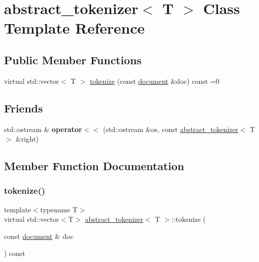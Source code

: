 \hypertarget{classabstract__tokenizer}{}\section{abstract\+\_\+tokenizer$<$ T $>$ Class Template Reference}
\label{classabstract__tokenizer}
\subsection*{Public Member Functions}
\begin{DoxyCompactItemize}
\item 
virtual std\+::vector$<$ T $>$ \hyperlink{classabstract__tokenizer_a5948210e787d9ed3681800b4e3926701}{tokenize} (const \hyperlink{classdocument}{document} \&doc) const =0
\end{DoxyCompactItemize}
\subsection*{Friends}
\begin{DoxyCompactItemize}
\item 
\mbox{\label{classabstract__tokenizer_a061c101e49ebd7f5acfdd596427e2276}} 
std\+::ostream \& {\bfseries operator$<$$<$} (std\+::ostream \&os, const \hyperlink{classabstract__tokenizer}{abstract\+\_\+tokenizer}$<$ T $>$ \&right)
\end{DoxyCompactItemize}


\subsection{Member Function Documentation}
\mbox{\label{classabstract__tokenizer_a5948210e787d9ed3681800b4e3926701}} 
\subsubsection{\texorpdfstring{tokenize()}{tokenize()}}
{\footnotesize\ttfamily template$<$typename T$>$ \\
virtual std\+::vector$<$T$>$ \hyperlink{classabstract__tokenizer}{abstract\+\_\+tokenizer}$<$ T $>$\+::tokenize (\begin{DoxyParamCaption}\item[{const \hyperlink{classdocument}{document} \&}]{doc }\end{DoxyParamCaption}) const\hspace{0.3cm}{\ttfamily [pure virtual]}}

